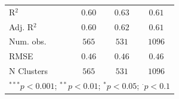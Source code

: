 \begin{table}[!htpb]
\begin{center}
{\begin{tabular}{l c c c}
\hline
R$^2$                                                          & $0.60$       & $0.63$       & $0.61$       \\
Adj. R$^2$                                                     & $0.60$       & $0.62$       & $0.61$       \\
Num. obs.                                                      & $565$        & $531$        & $1096$       \\
RMSE                                                           & $0.46$       & $0.46$       & $0.46$       \\
N Clusters                                                     & $565$        & $531$        & $1096$       \\
\hline
\multicolumn{4}{l}{\scriptsize{$^{***}p<0.001$; $^{**}p<0.01$; $^{*}p<0.05$; $^{\cdot}p<0.1$}}
\end{tabular}
}
\label{tab:tripleinteraction-mainspecification-remove-weighted-clusteredses-ld}
\end{center}
\end{table}
